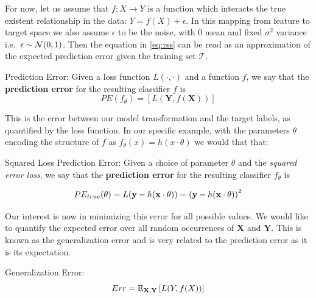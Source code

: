 
For now, let us assume that $f: X \rightarrow Y$ is a function which interacts the true existent relationship in the data: $Y = f(X) + \epsilon$.
In this mapping from feature to target space we also assume $\epsilon$ to be the noise, with $0$ mean and fixed $\sigma^2$ variance i.e.\ $\epsilon \sim \operatorname{\mathcal{N}}(0,1)$.
Then the equation in \cref{eq:rss} can be read as an approximation of the expected prediction error given the training set $\mathcal{T}$.


\begin{definition}{Prediction Error:}
	Given a loss function $L(\cdot,\cdot)$ and a function $f$, we say that the \textbf{prediction error} for the resulting classifier $f$ is
	\[
	PE(f_\theta)= \left[ L(\textbf{Y},f(\textbf{X}))\right]
	\]
\end{definition}

This is the error between our model transformation and the target labels, as quantified by the loss function.
 In our specific example, with the parameters $\theta$ encoding the structure of $f$ as $f_\theta(x) = h(x \cdot \theta)$ we would that that:

\begin{definition}{Squared Loss Prediction Error:}
	Given a choice of parameter $\theta$ and the \textit{squared error loss}, we say that the \textbf{prediction error} for the resulting classifier $f_\theta$ is

	\begin{equation}
	PE_{true}(\theta) =L(\textbf{y} - h(\textbf{x} \cdot \theta) )  \\
	=  {(\textbf{y} - h(\textbf{x} \cdot \theta) )}^2
	\end{equation}

\end{definition}

Our interest is now in minimizing this error for all possible values.
We would like to quantify the expected error over all random occurrences of $\textbf{X}$ and $\textbf{Y}$.
This is known as the generalization error and is very related to the prediction error as it is its expectation.

\begin{definition}{Generalization Error:}
\begin{equation}
Err = \operatorname{\mathbb{E}}_{ \textbf{X}, \textbf{Y} } \left[ L(Y,f(X)) \right]
\end{equation}
\end{definition}

